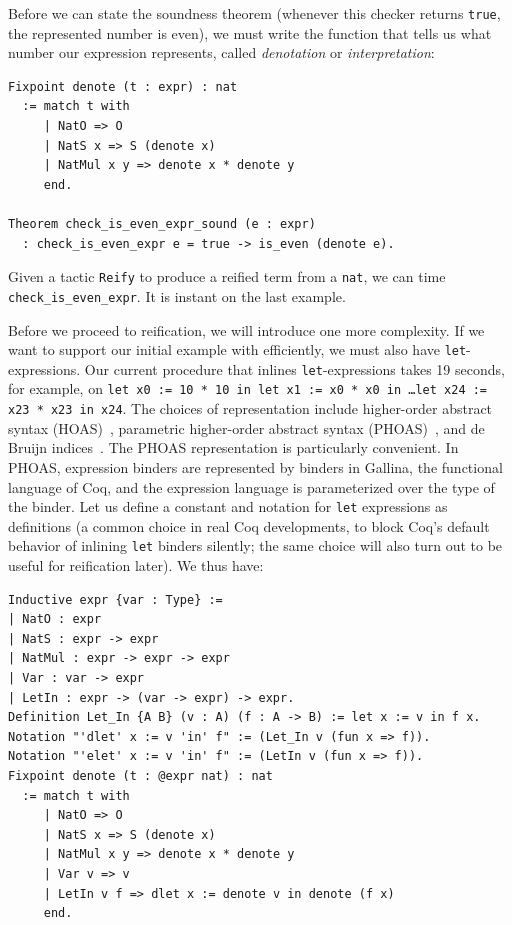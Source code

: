 Before we can state the soundness theorem (whenever this checker returns \texttt{true}, the represented number is even), we must write the function that tells us what number our expression represents, called \emph{denotation} or \emph{interpretation}:
\begin{verbatim}
Fixpoint denote (t : expr) : nat
  := match t with
     | NatO => O
     | NatS x => S (denote x)
     | NatMul x y => denote x * denote y
     end.

Theorem check_is_even_expr_sound (e : expr)
  : check_is_even_expr e = true -> is_even (denote e).
\end{verbatim}

Given a tactic \texttt{Reify} to produce a reified term from a \verb|nat|, we can time \verb|check_is_even_expr|.
It is instant on the last example.%

Before we proceed to reification, we will introduce one more complexity.
If we want to support our initial example with \space efficiently, we must also have \texttt{let}-expressions.
Our current procedure that inlines \texttt{let}-expressions takes 19 seconds, for example, on \texttt{let x0 := 10 * 10 in let x1 := x0 * x0 in \ldots\space let x24 := x23 * x23 in x24}.
The choices of representation include higher-order abstract syntax (HOAS)~\cite{HOAS}, parametric higher-order abstract syntax (PHOAS)~\cite{PhoasICFP08}, and de Bruijn indices~\cite{debruijn1972}.
The PHOAS representation is particularly convenient.
In PHOAS, expression binders are represented by binders in Gallina, the functional language of Coq, and the expression language is parameterized over the type of the binder.
Let us define a constant and notation for \texttt{let} expressions as definitions (a common choice in real Coq developments, to block Coq's default behavior of inlining \texttt{let} binders silently; the same choice will also turn out to be useful for reification later).
We thus have: \label{sec:phoas-expr-def}
\begin{verbatim}
Inductive expr {var : Type} :=
| NatO : expr
| NatS : expr -> expr
| NatMul : expr -> expr -> expr
| Var : var -> expr
| LetIn : expr -> (var -> expr) -> expr.
Definition Let_In {A B} (v : A) (f : A -> B) := let x := v in f x.
Notation "'dlet' x := v 'in' f" := (Let_In v (fun x => f)).
Notation "'elet' x := v 'in' f" := (LetIn v (fun x => f)).
Fixpoint denote (t : @expr nat) : nat
  := match t with
     | NatO => O
     | NatS x => S (denote x)
     | NatMul x y => denote x * denote y
     | Var v => v
     | LetIn v f => dlet x := denote v in denote (f x)
     end.
\end{verbatim}

